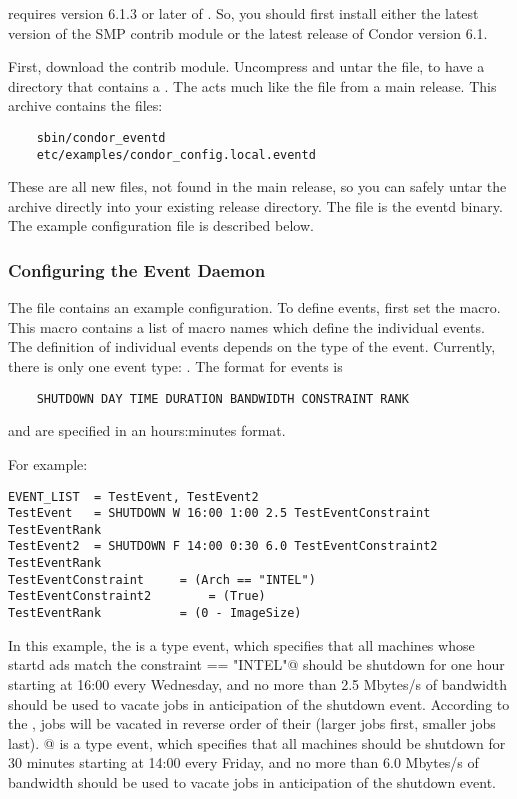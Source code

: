  requires version 6.1.3 or later of
.
So, you should first install either the latest version of the SMP
 contrib module or the latest release of Condor version
6.1.

First, download the  contrib module.
Uncompress and untar the file, to have a directory that
contains a .
The  acts much like the  file from
a main release.
This archive contains the files:
\begin{verbatim}
	sbin/condor_eventd
	etc/examples/condor_config.local.eventd
\end{verbatim}
These are all new files, not found in the main release, so you can
safely untar the archive directly into your existing release
directory.
The file  is the eventd binary.
The example configuration file is described below.

\subsubsection{\label{sec:EventD-Configuration}
Configuring the Event Daemon} 

The file  contains an
example configuration.
To define events, first set the  macro.
This macro contains a list of macro names which define the individual
events.
The definition of individual events depends on the type of the event.
Currently, there is only one event type: .
The format for  events is
\begin{verbatim}
	SHUTDOWN DAY TIME DURATION BANDWIDTH CONSTRAINT RANK
\end{verbatim}
\verb@TIME@ and \verb@DURATION@ are specified in an hours:minutes format.

For example:
\begin{verbatim}
EVENT_LIST	= TestEvent, TestEvent2
TestEvent	= SHUTDOWN W 16:00 1:00 2.5 TestEventConstraint TestEventRank
TestEvent2	= SHUTDOWN F 14:00 0:30 6.0 TestEventConstraint2 TestEventRank
TestEventConstraint		= (Arch == "INTEL")
TestEventConstraint2		= (True)
TestEventRank			= (0 - ImageSize)
\end{verbatim}

In this example, the \verb@TestEvent@ is a  type event, which
specifies that all machines whose startd ads match the constraint
\verb@Arch == "INTEL"@ should be shutdown for one hour starting at
16:00 every Wednesday, and no more than 2.5 Mbytes/s of bandwidth
should be used to vacate jobs in anticipation of the shutdown
event.  According to the \verb@TestEventRank@, jobs will be vacated in
reverse order of their  (larger jobs first, smaller jobs
last).  @ is a  type event, which specifies
that all machines should be shutdown for 30 minutes starting at
14:00 every Friday, and no more than 6.0 Mbytes/s of bandwidth should
be used to vacate jobs in anticipation of the shutdown event.

